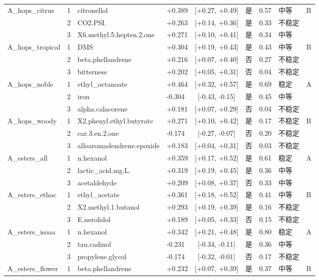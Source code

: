 \begin{longtable}{llllcccll}
A\_hops\_citrus & 1 & citronellol & +0.389 & [+0.27, +0.49] & 是 & 0.57 & 中等 & B \\
 & 2 & CO2.PSI. & +0.263 & [+0.14, +0.36] & 是 & 0.33 & 不稳定 &  \\
 & 3 & X6.methyl.5.hepten.2.one & +0.271 & [+0.10, +0.41] & 是 & 0.34 & 中等 &  \\
A\_hops\_tropical & 1 & DMS & +0.304 & [+0.19, +0.43] & 是 & 0.43 & 中等 & B \\
 & 2 & beta.phellandrene & +0.216 & [+0.07, +0.40] & 否 & 0.27 & 不稳定 &  \\
 & 3 & bitterness & +0.202 & [+0.05, +0.31] & 否 & 0.04 & 不稳定 &  \\
A\_hops\_noble & 1 & ethyl\_octanoate & +0.464 & [+0.32, +0.57] & 是 & 0.69 & 稳定 & A \\
 & 2 & iron & -0.304 & [-0.43, -0.15] & 是 & 0.45 & 中等 &  \\
 & 3 & alpha.calacorene & +0.181 & [+0.07, +0.29] & 否 & 0.04 & 不稳定 &  \\
A\_hops\_woody & 1 & X2.phenyl.ethyl.butyrate & +0.271 & [+0.10, +0.42] & 是 & 0.17 & 不稳定 & B \\
 & 2 & car.3.en.2.one & -0.174 & [-0.27, -0.07] & 否 & 0.20 & 不稳定 &  \\
 & 3 & alloaromadendrene.epoxide & +0.183 & [+0.04, +0.31] & 否 & 0.03 & 不稳定 &  \\
A\_esters\_all & 1 & n.hexanol & +0.359 & [+0.17, +0.52] & 是 & 0.61 & 稳定 & A \\
 & 2 & lactic\_acid.mg.L. & +0.319 & [+0.19, +0.45] & 是 & 0.36 & 中等 &  \\
 & 3 & acetaldehyde & +0.209 & [+0.08, +0.37] & 否 & 0.33 & 中等 &  \\
A\_esters\_ethac & 1 & ethyl\_acetate & +0.361 & [+0.18, +0.52] & 是 & 0.41 & 中等 & B \\
 & 2 & X2.methyl.1.butanol & +0.293 & [+0.19, +0.39] & 是 & 0.16 & 不稳定 &  \\
 & 3 & E.nerolidol & +0.189 & [+0.05, +0.33] & 否 & 0.15 & 不稳定 &  \\
A\_esters\_isoaa & 1 & n.hexanol & +0.342 & [+0.21, +0.48] & 是 & 0.80 & 稳定 & A \\
 & 2 & tau.cadinol & -0.231 & [-0.34, -0.11] & 是 & 0.36 & 中等 &  \\
 & 3 & propylene.glycol & -0.174 & [-0.32, -0.01] & 否 & 0.17 & 不稳定 &  \\
A\_esters\_flower & 1 & beta.phellandrene & +0.232 & [+0.07, +0.39] & 是 & 0.37 & 中等 & B \\

\end{longtable}
